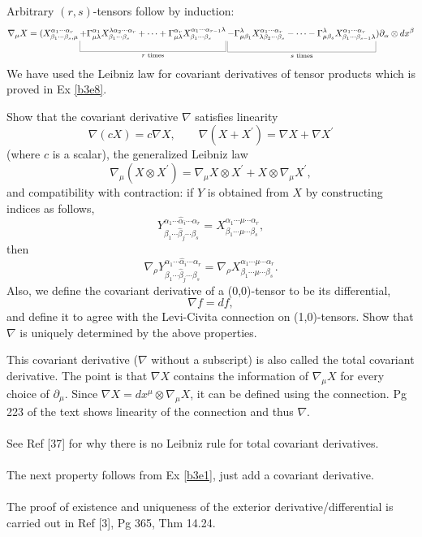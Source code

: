 \documentclass[10pt]{article}
\begin{document}
Arbitrary $(r,s)$-tensors follow by induction:
$$
	\nabla_\mu X = (X_{\beta_1\cdots\beta_s,\mu}^{\alpha_1\cdots\alpha_r}\ub{+\Gamma_{\mu\lambda}^{\alpha_1} X_{\beta_1\cdots\beta_s}^{\lambda\alpha_2\cdots\alpha_r}+\cdots+\Gamma_{\mu\lambda}^{\alpha_r} X_{\beta_1\cdots\beta_s}^{\alpha_1\cdots\alpha_{r-1}\lambda}}{r\text{ times}}\ub{-\Gamma_{\mu\beta_1}^\lambda X_{\lambda\beta_2\cdots\beta_s}^{\alpha_1\cdots\alpha_r}-\cdots-\Gamma_{\mu\beta_s}^\lambda X_{\beta_1\cdots\beta_{s-1}\lambda}^{\alpha_1\cdots\alpha_r}}{s\text{ times}})\partial_\alpha\otimes dx^\beta
$$
We have used the Leibniz law for covariant derivatives of tensor products which is proved in Ex \ref{b3e8}.


\begin{example}\label{b3e8}
	Show that the covariant derivative $\nabla$ satisfies linearity
	$$
	\nabla(cX)=c\nabla X,\qquad \nabla(X+X^\prime)=\nabla X+\nabla X^\prime
	$$
	(where $c$ is a scalar), the generalized Leibniz law
	$$
	\nabla_\mu(X \otimes X^\prime) = \nabla_\mu X \otimes X^\prime + X \otimes  \nabla_\mu X^\prime,
	$$
	and compatibility with contraction: if $Y$ is obtained from $X$ by constructing indices as follows,
	$$
	Y_{\beta_1\cdots\hat{\beta}_j\cdots\beta_s}^{\alpha_1\cdots\hat{\alpha}_i\cdots\alpha_r}=X_{\beta_1\cdots\mu\cdots\beta_s}^{\alpha_1\cdots\mu\cdots\alpha_r},
	$$
	then
	$$
	\nabla_\rho Y_{\beta_1\cdots\hat{\beta}_j\cdots\beta_s}^{\alpha_1\cdots\hat{\alpha}_i\cdots\alpha_r}=\nabla_\rho X_{\beta_1\cdots\mu\cdots\beta_s}^{\alpha_1\cdots\mu\cdots\alpha_r}.
	$$
	Also, we define the covariant derivative of a (0,0)-tensor to be its differential,
	$$
	\nabla f = df,
	$$
	and define it to agree with the Levi-Civita connection on (1,0)-tensors. Show that $\nabla$ is uniquely determined by the above properties.
\end{example}
\sol This covariant derivative ($\nabla$ without a subscript) is also called the total covariant derivative. The point is that $\nabla X$ contains the information of $\nabla_\mu X$ for every choice of $\partial_\mu$. Since $\nabla X= dx^\mu \otimes \nabla_\mu X$, it can be defined using the connection. Pg 223 of the text shows linearity of the connection and thus $\nabla$.\\\\
See Ref [37] for why there is no Leibniz rule for total covariant derivatives.\\\\
The next property follows from Ex \ref{b3e1}, just add a covariant derivative.\\\\
The proof of existence and uniqueness of the exterior derivative/differential is carried out in Ref [3], Pg 365, Thm 14.24.
\end{document}
